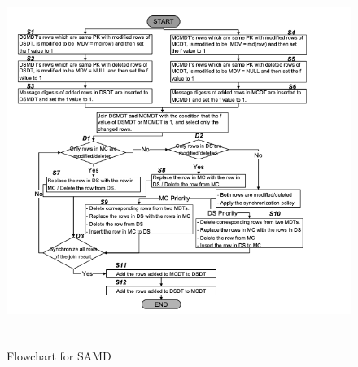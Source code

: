 \documentclass[conference]{IEEEtran}
\begin{document}
\begin{enumerate}[label=(\Alph*)]
\begin{figure}
	\centering
	\includegraphics[width=\textwidth, height=12cm]{flowchart.png} 
	\caption{Flowchart for SAMD}
	\label{fig:flowchart1s}
\end{figure}




\end{enumerate}
\end{document}
